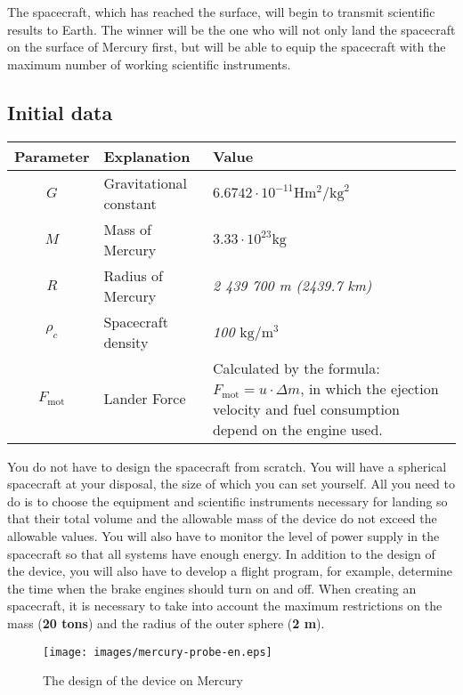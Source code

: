 \documentclass[12pt,a4paper]{article}
\begin{document}
The spacecraft, which has reached the surface, will begin to transmit scientific results to Earth. The winner will be the one who will not only land the spacecraft on the surface of Mercury first, but will be able to equip the spacecraft with the maximum number of working scientific instruments.

\subsection{Initial data}

\begin{center}
\begin{tabular}{ |c|p{6.5cm}|p{6cm}| }
  \hline
  \textbf{Parameter} & \textbf{Explanation} & \textbf{Value} \\
   \hline
   $ G $ & Gravitational constant & $ 6.6742 \cdot 10^{-11} \text{H} \text{m}^{2}/\text{kg}^{2} $ \\
   \hline
   $ M $ & Mass of Mercury & $3.33 \cdot 10^{23} \text{kg}$ \\
   \hline
   $ R $ & Radius of Mercury & \emph{2 439 700 m (2439.7 km)} \\
   \hline
   $ \rho_c $ & Spacecraft density & \emph{100 $\text{kg}/\text{m}^3$} \\
   \hline
   $ F_{\text{mot}} $ & Lander Force &
   Calculated by the formula: $ F_{\text{mot}} = u \cdot \Delta m$, in which the ejection velocity
   and fuel consumption depend on the engine used.\\
  \hline
\end{tabular}
\end{center}

You do not have to design the spacecraft from scratch. You will have a spherical spacecraft at your disposal, the size of which you can set yourself. All you need to do is to choose the equipment and scientific instruments necessary for landing so that their total volume and the allowable mass of the device do not exceed the allowable values. You will also have to monitor the level of power supply in the spacecraft so that all systems have enough energy. In addition to the design of the device, you will also have to develop a flight program, for example, determine the time when the brake engines should turn on and off. When creating an spacecraft, it is necessary to take into account the maximum restrictions on the mass (\textbf{20 tons}) and the radius of the outer sphere (\textbf{2 m}).

\begin{figure}[tbh]
  \begin{center}
    \texttt{[image: images/mercury-probe-en.eps]}
    \caption{The design of the device on Mercury}
    \label{Pic:mercury-probe}
  \end{center}
\end{figure}
\end{document}
